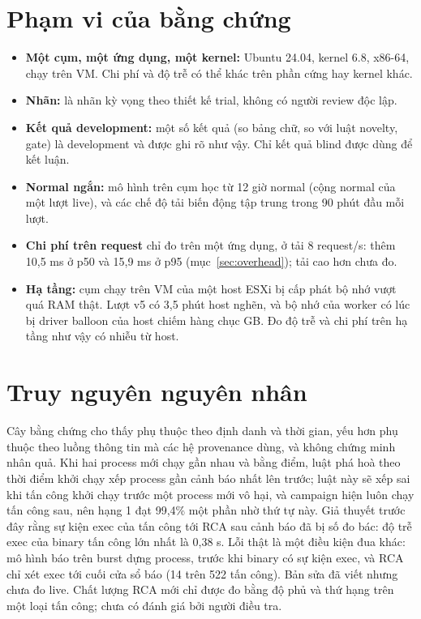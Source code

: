 \section{Phạm vi của bằng chứng}

\begin{itemize}
\tightlist
\item
  \textbf{Một cụm, một ứng dụng, một kernel:} Ubuntu 24.04, kernel 6.8, x86-64, chạy trên VM. Chi phí và độ trễ có thể khác trên phần cứng hay kernel khác.
\item
  \textbf{Nhãn:} là nhãn kỳ vọng theo thiết kế trial, không có người review độc lập.
\item
  \textbf{Kết quả development:} một số kết quả (so bảng chữ, so với luật novelty, gate) là development và được ghi rõ như vậy. Chỉ kết quả blind được dùng để kết luận.
\item
  \textbf{Normal ngắn:} mô hình trên cụm học từ 12 giờ normal (cộng normal của một lượt live), và các chế độ tải biến động tập trung trong 90 phút đầu mỗi lượt.
\item
  \textbf{Chi phí trên request} chỉ đo trên một ứng dụng, ở tải 8 request/s: thêm 10,5 ms ở p50 và 15,9 ms ở p95 (mục~\ref{sec:overhead}); tải cao hơn chưa đo.
\item
  \textbf{Hạ tầng:} cụm chạy trên VM của một host ESXi bị cấp phát bộ nhớ vượt quá RAM thật. Lượt v5 có 3,5 phút host nghẽn, và bộ nhớ của worker có lúc bị driver balloon của host chiếm hàng chục GB. Đo độ trễ và chi phí trên hạ tầng như vậy có nhiễu từ host.
\end{itemize}

\section{Truy nguyên nguyên nhân}

Cây bằng chứng cho thấy phụ thuộc theo định danh và thời gian, yếu hơn phụ thuộc theo luồng thông tin mà các hệ provenance dùng, và không chứng minh nhân quả. Khi hai process mới chạy gần nhau và bằng điểm, luật phá hoà theo thời điểm khởi chạy xếp process gần cảnh báo nhất lên trước; luật này sẽ xếp sai khi tấn công khởi chạy trước một process mới vô hại, và campaign hiện luôn chạy tấn công sau, nên hạng 1 đạt 99,4\% một phần nhờ thứ tự này. Giả thuyết trước đây rằng sự kiện exec của tấn công tới RCA sau cảnh báo đã bị số đo bác: độ trễ exec của binary tấn công lớn nhất là 0,38 s. Lỗi thật là một điều kiện đua khác: mô hình báo trên burst dựng process, trước khi binary có sự kiện exec, và RCA chỉ xét exec tới cuối cửa sổ báo (14 trên 522 tấn công). Bản sửa đã viết nhưng chưa đo live. Chất lượng RCA mới chỉ được đo bằng độ phủ và thứ hạng trên một loại tấn công; chưa có đánh giá bởi người điều tra.
